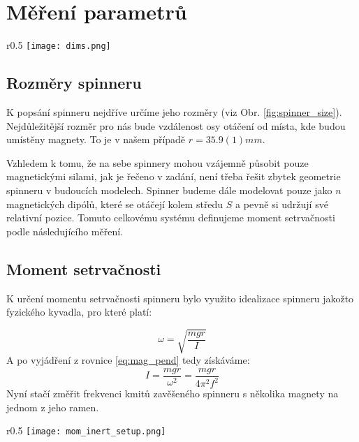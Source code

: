 \documentclass[12pt, a4paper,
 twoside,        %
 openright
]{report}
\begin{document}
\chapter{Měření parametrů}
\label{chap:param}

\begin{wrapfigure}{r}{0.5\textwidth}
    \texttt{[image: dims.png]}
    \centering
    \caption{Ilustrace spinneru společně s vyznačenými rozměry}
    \label{fig:spinner_size}
\end{wrapfigure}

\section{Rozměry spinneru}
\label{sec:spinner_size}
K popsání spinneru nejdříve určíme jeho rozměry (viz Obr. \ref{fig:spinner_size}).
Nejdůležitější rozměr pro nás bude vzdálenost osy otáčení od místa, kde budou umístěny magnety.
To je v našem případě $r = 35.9(1)mm$. 

Vzhledem k tomu, že na sebe spinnery mohou vzájemně působit pouze magnetickými silami, jak je řečeno v zadání, není třeba řešit zbytek geometrie spinneru v budoucích modelech.
Spinner budeme dále modelovat pouze jako $n$ magnetických dipólů, které se otáčejí kolem středu $S$ a pevně si udržují své relativní pozice.
Tomuto celkovému systému definujeme moment setrvačnosti podle následujícího měření.
\section{Moment setrvačnosti}
\label{sec:moment_of_inertia}
{\raggedright
K určení momentu setrvačnosti spinneru bylo využito idealizace spinneru jakožto fyzického kyvadla, pro které platí: \cite{physical_pendulum}
}
\begin{equation}
    \label{eq:mag_pend}
    \omega = \sqrt{\frac{mgr}{I}}
\end{equation}
A po vyjádření z rovnice \ref{eq:mag_pend} tedy získáváme:
\begin{equation}
    \label{eq:mom_inert}
    I = \frac{mgr}{\omega^2} = \frac{mgr}{4\pi^2f^2}
\end{equation}
Nyní stačí změřit frekvenci kmitů zavěšeného spinneru s několika magnety na jednom z jeho ramen.

\begin{wrapfigure}{r}{0.5\textwidth}
    \texttt{[image: mom\_inert\_setup.png]}
    \centering
    \caption{Ilustrace aparatury pro měření frekvence kmitů spinneru}
    \label{fig:spinner_pendulum_aparature}
\end{wrapfigure}
\end{document}

